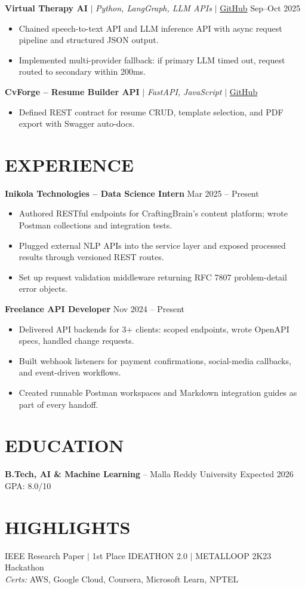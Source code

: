 \documentclass[10pt]{article}
\begin{document}
\textbf{Virtual Therapy AI} $|$ \textit{Python, LangGraph, LLM APIs} $|$ \href{https://github.com/JeetInTech/Virtual-Therapist---LangGraph-Agentic-AI-System}{GitHub} \hfill Sep--Oct 2025
\begin{itemize}
\item Chained speech-to-text API and LLM inference API with async request pipeline and structured JSON output.
\item Implemented multi-provider fallback: if primary LLM timed out, request routed to secondary within 200ms.
\end{itemize}

\textbf{CvForge -- Resume Builder API} $|$ \textit{FastAPI, JavaScript} $|$ \href{https://github.com/JeetInTech/CvForge-Online}{GitHub}
\begin{itemize}
\item Defined REST contract for resume CRUD, template selection, and PDF export with Swagger auto-docs.
\end{itemize}

\section*{EXPERIENCE}
\textbf{Inikola Technologies -- Data Science Intern} \hfill Mar 2025 -- Present
\begin{itemize}
\item Authored RESTful endpoints for CraftingBrain's content platform; wrote Postman collections and integration tests.
\item Plugged external NLP APIs into the service layer and exposed processed results through versioned REST routes.
\item Set up request validation middleware returning RFC 7807 problem-detail error objects.
\end{itemize}

\textbf{Freelance API Developer} \hfill Nov 2024 -- Present
\begin{itemize}
\item Delivered API backends for 3+ clients: scoped endpoints, wrote OpenAPI specs, handled change requests.
\item Built webhook listeners for payment confirmations, social-media callbacks, and event-driven workflows.
\item Created runnable Postman workspaces and Markdown integration guides as part of every handoff.
\end{itemize}

\section*{EDUCATION}
\textbf{B.Tech, AI \& Machine Learning} -- Malla Reddy University \hfill Expected 2026 \hfill GPA: 8.0/10

\section*{HIGHLIGHTS}
IEEE Research Paper $|$ 1st Place IDEATHON 2.0 $|$ METALLOOP 2K23 Hackathon \\
\textit{Certs:} AWS, Google Cloud, Coursera, Microsoft Learn, NPTEL
\end{document}
